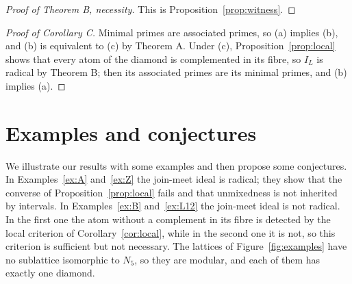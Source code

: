 \documentclass{amsart}
\theoremstyle{definition}
\begin{document}
\begin{proof}[Proof of Theorem B, necessity]
This is Proposition~\ref{prop:witness}.
\end{proof}

\begin{proof}[Proof of Corollary C]
Minimal primes are associated primes, so (a) implies (b), and (b) is equivalent to (c) by Theorem A. Under (c), Proposition~\ref{prop:local} shows that every atom of the diamond is complemented in its fibre, so $I_L$ is radical by Theorem B; then its associated primes are its minimal primes, and (b) implies (a).
\end{proof}

\section{Examples and conjectures}\label{sec:final}


We illustrate our results with some examples and then propose some conjectures. In Examples~\ref{ex:A} and~\ref{ex:Z} the join-meet ideal is radical; they show that the converse of Proposition~\ref{prop:local} fails and that unmixedness is not inherited by intervals. In Examples~\ref{ex:B} and~\ref{ex:L12} the join-meet ideal is not radical. In the first one the atom without a complement in its fibre is detected by the local criterion of Corollary~\ref{cor:local}, while in the second one it is not, so this criterion is sufficient but not necessary. The lattices of Figure~\ref{fig:examples} have no sublattice isomorphic to $N_5$, so they are modular, and each of them has exactly one diamond.
\end{document}
